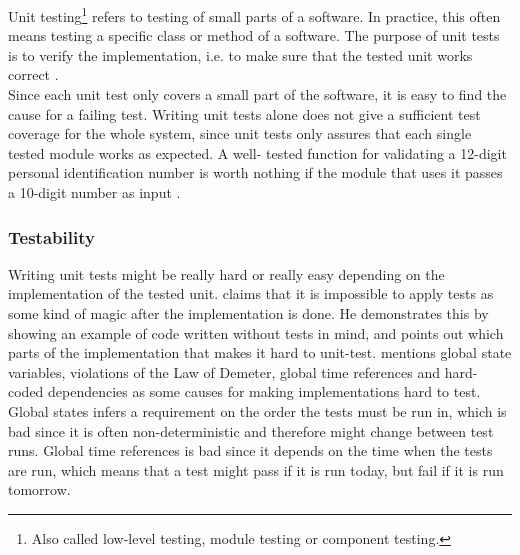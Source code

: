 \MakeShortVerb{\|}


Unit testing\footnote{Also called low-level testing, module testing or
component testing.} refers to testing of small parts of a software. In
practice, this often means testing a specific class or method of a
software. The purpose of unit tests is to verify the implementation,
i.e. to make sure that the tested unit works correct
\cite{book:pfleeger}.\\

Since each unit test only covers a small part of the software, it is
easy to find the cause for a failing test. Writing unit tests alone does
not give a sufficient test coverage for the whole system, since unit
tests only assures that each single tested module works as expected. A
well- tested function for validating a 12-digit personal identification
number is worth nothing if the module that uses it passes a 10-digit
number as input \cite{wiki:unittests}.\\


\subsubsection{Testability}

Writing unit tests might be really hard or really easy depending on the
implementation of the tested unit. \citet{video:misko_psychology} claims
that it is impossible to apply tests as some kind of magic after the
implementation is done. He demonstrates this by showing an example of
code written without tests in mind, and points out which parts of the
implementation that makes it hard to unit-test.
\citeauthor{video:misko_psychology} mentions global state variables,
violations of the Law of Demeter, global time references
and hard-coded dependencies as some causes for making implementations
hard to test.\\

Global states infers a requirement on the order the tests
must be run in, which is bad since it is often non-deterministic and
therefore might change between test runs. Global time references is bad
since it depends on the time when the tests are run, which means that a
test might pass if it is run today, but fail if it is run tomorrow.\\

